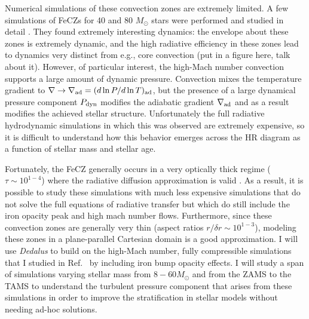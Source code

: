 \documentclass[12pt]{article}
\begin{document}
Numerical simulations of these convection zones are extremely limited.
A few simulations of FeCZs for 40 and 80 $M_{\odot}$ stars were performed \citep{jiang_etal_2015} and studied in detail \citep{schultz_etal_2020}.
They found extremely interesting dynamics: the envelope about these zones is extremely dynamic, and the high radiative efficiency in these zones lead to dynamics very distinct from e.g., core convection (put in a figure here, talk about it).
However, of particular interest, the high-Mach number convection supports a large amount of dynamic pressure.
Convection mixes the temperature gradient to $\nabla \rightarrow \nabla_{\rm ad} = (d\ln P/ d\ln T)_{\rm ad}$, but the presence of a large dynamical pressure component $P_{\rm dyn}$ modifies the adiabatic gradient $\nabla_{\rm ad}$ and as a result modifies the achieved stellar structure.
Unfortunately the full radiative hydrodynamic simulations in which this was observed are extremely expensive, so it is difficult to understand how this behavior emerges across the HR diagram as a function of stellar mass and stellar age.

Fortunately, the FeCZ generally occurs in a very optically thick regime ($\tau \sim 10^{1-4}$) where the radiative diffusion approximation is valid \citep{jermyn_etal_2022_atlas}.
As a result, it is possible to study these simulations with much less expensive simulations that do not solve the full equations of radiative transfer but which do still include the iron opacity peak and high mach number flows.
Furthermore, since these convection zones are generally very thin (aspect ratios $r / \delta r \sim 10^{1-3}$), modeling these zones in a plane-parallel Cartesian domain is a good approximation.
I will use \emph{Dedalus} to build on the high-Mach number, fully compressible simulations that I studied in Ref.~\citep{anders_brown_2017} by including iron bump opacity effects.
I will study a span of simulations varying stellar mass from $8-60 M_{\odot}$ and from the ZAMS to the TAMS to understand the turbulent pressure component that arises from these simulations in order to improve the stratification in stellar models without needing ad-hoc solutions.
\end{document}
